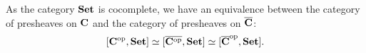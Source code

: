 \begin{corollary}\label{cor:karoubi-presheaf}
  As the category $ \mathbf{Set} $ is cocomplete, we have an equivalence between the category of presheaves on $ \mathbf{C} $ and the category of presheaves on $ \overline {\mathbf{C}} $:
  \[ [\mathbf{C}^{\text{op}}, \mathbf{Set}] \simeq [\overline{\mathbf{C}^{\text{op}}}, \mathbf{Set}] \simeq [\overline {\mathbf{C}}^{\text{op}}, \mathbf{Set}]. \]
\end{corollary}
